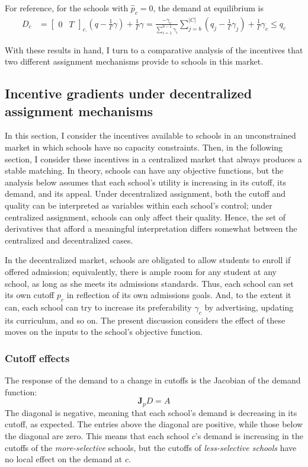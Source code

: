 \documentclass[12pt]{article}
\theoremstyle{definition}
\begin{document}
For reference, for the schools with $\hat p_c = 0$, the demand at equilibrium is 
\begin{align} \label{demand-pc-eq-zero}
D_c &=
\begin{bmatrix}
0& T
\end{bmatrix}_{c.} \left(q - \frac{1}{\Gamma}\gamma\right) + \frac{1}{\Gamma}\gamma  
= \frac{-\gamma_c}{\sum_{i=1}^{b-1} \gamma_i} \sum_{j=b}^{|C|} \left(q_j - \frac{1}{\Gamma}\gamma_j\right)  + \frac{1}{\Gamma}\gamma_c \leq q_c
\end{align}

With these results in hand, I turn to a comparative analysis of the incentives that two different assignment mechanisms provide to schools in this market.

\subsection{Incentive gradients under decentralized assignment mechanisms}
In this section, I consider the incentives available to schools in an unconstrained market in which schools have no capacity constraints. Then, in the following section, I consider these incentives in a centralized market that always produces a stable matching. In theory, schools can have any objective functions, but the analysis below assumes that each school's utility is increasing in its cutoff, its demand, and its appeal. Under decentralized assignment, both the cutoff and quality can be interpreted as variables within each school's control; under centralized assignment, schools can only affect their quality. Hence, the set of derivatives that afford a meaningful interpretation differs somewhat between the centralized and decentralized cases. 

In the decentralized market, schools are obligated to allow students to enroll if offered admission; equivalently, there is ample room for any student at any school, as long as she meets its admissions standards. Thus, each school can set its own cutoff $p_c$ in reflection of its own admissions goals. And, to the extent it can, each school can try to increase its preferability $\gamma_c$ by advertising, updating its curriculum, and so on. The present discussion considers the effect of these moves on the inputs to the school's objective function. 

\subsubsection{Cutoff effects} \label{unconstrainedcutoffeffects}
The response of the demand to a change in cutoffs is the Jacobian of the demand function:
\[\mathbf{J}_p D = A \]
The diagonal is negative, meaning that each school's demand is decreasing in its cutoff, as expected. The entries above the diagonal are positive, while those below the diagonal are zero. This means that each school $c$'s demand is increasing in the cutoffs of the \emph{more-selective} schools, but the cutoffs of \emph{less-selective schools} have no local effect on the demand at $c$.
\end{document}
